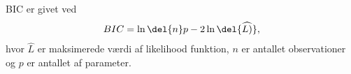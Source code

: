 \begin{defn}
BIC er givet ved
\begin{align*}
BIC = \ln\del{n}p - 2 \ln\del{\widehat{L)}}, \label{eq:bic}
\end{align*}
hvor $\widehat{L}$ er maksimerede værdi af likelihood funktion, $n$ er antallet observationer og $p$ er antallet af parameter.
\end{defn}